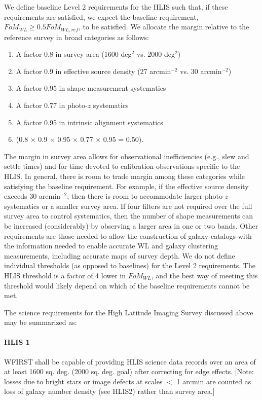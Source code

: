 We define baseline Level 2 requirements for the HLIS such that, if these
requirements are satisfied, we expect the baseline requirement, $FoM_{WL}\geq
0.5 FoM_{WL,ref}$, to be satisfied. We allocate the margin relative to the
reference survey in broad categories as follows:
\begin{enumerate}
\item	A factor 0.8 in survey area (1600 deg$^2$ vs. 2000 deg$^2$)
\item	A factor 0.9 in effective source density (27 arcmin$^{-2}$ vs. 30 arcmin$^{-2}$)
\item	A factor 0.95 in shape measurement systematics
\item	A factor 0.77 in photo-$z$ systematics
\item	A factor 0.95 in intrinsic alignment systematics
\item (0.8 $\times$ 0.9 $\times$ 0.95 $\times$ 0.77 $\times$ 0.95 = 0.50).
\end{enumerate}

The margin in survey area allows for observational inefficiencies (e.g., slew
and settle times) and for time devoted to calibration observations specific to
the HLIS. In general, there is room to trade margin among these categories while
satisfying the baseline requirement.  For example, if the effective source
density exceeds 30 arcmin$^{-2}$, then there is room to accommodate larger photo-$z$
systematics or a smaller survey area.  If four filters are not required over the
full survey area to control systematics, then the number of shape measurements
can be increased (considerably) by observing a larger area in one or two bands.
Other requirements are those needed to allow the construction of galaxy catalogs
with the information needed to enable accurate WL and galaxy clustering
measurements, including accurate maps of survey depth. We do not define
individual thresholds (as opposed to baselines) for the Level 2 requirements.
The HLIS threshold is a factor of 4 lower in $FoM_{WL}$, and the best way of meeting
this threshold would likely depend on which of the baseline requirements cannot
be met.

The science requirements for the High Latitude Imaging Survey discussed above
may be summarized as:

\paragraph{HLIS 1} WFIRST shall be capable of providing HLIS science data
records over an area of at least 1600 sq. deg. (2000 sq. deg. goal) after correcting for
edge effects. [Note: losses due to bright stars or image defects at scales $<$ 1
arcmin are counted as loss of galaxy number density (see HLIS2) rather than
survey area.]

